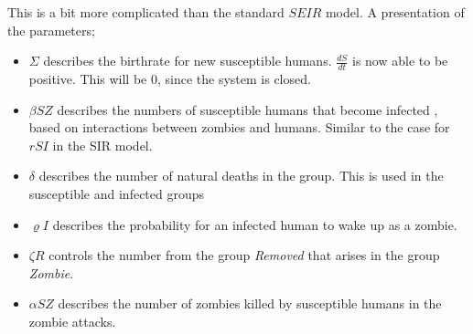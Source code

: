 \documentclass[%
twoside,                 %
final,                   %
chapterprefix=true,      %
open=right               %
10pt]{book}
\begin{document}
This is a bit more complicated than the standard $SEIR$ model. A presentation of the parameters;
\begin{itemize}
\item $\Sigma$ describes the birthrate for new susceptible humans. $\frac{dS}{dt}$ is now able to be positive. This will be 0, since the system is closed. 

\item $\beta SZ$ describes the numbers of susceptible humans that become infected , based on interactions between zombies and humans. Similar to the case for $rSI$ in the SIR model. 

\item $\delta$ describes the number of natural deaths in the group. This is used in the susceptible and infected groups

\item $\varrho I$ describes the probability for an infected human to wake up as a zombie.

\item $\zeta R$ controls the number from the group \emph{Removed} that arises in the group \emph{Zombie}. 

\item $\alpha SZ$ describes the number of zombies killed by susceptible humans in the zombie attacks. 
\end{itemize}

\noindent


\vspace{3mm}




\vspace{3mm}
\end{document}
